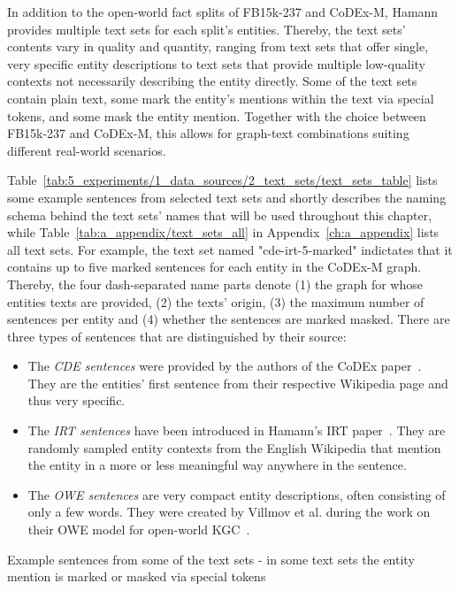In addition to the open-world fact splits of FB15k-237 and CoDEx-M, Hamann provides multiple text sets for each split's entities. Thereby, the text sets' contents vary in quality and quantity, ranging from text sets that offer single, very specific entity descriptions to text sets that provide multiple low-quality contexts not necessarily describing the entity directly. Some of the text sets contain plain text, some mark the entity's mentions within the text via special tokens, and some mask the entity mention. Together with the choice between FB15k-237 and CoDEx-M, this allows for graph-text combinations suiting different real-world scenarios.

Table~\ref{tab:5_experiments/1_data_sources/2_text_sets/text_sets_table} lists some example sentences from selected text sets and shortly describes the naming schema behind the text sets' names that will be used throughout this chapter, while Table~\ref{tab:a_appendix/text_sets_all} in Appendix~\ref{ch:a_appendix} lists all text sets. For example, the text set named "cde-irt-5-marked" indictates that it contains up to five marked sentences for each entity in the CoDEx-M graph. Thereby, the four dash-separated name parts denote (1) the graph for whose entities texts are provided, (2) the texts' origin, (3) the maximum number of sentences per entity and (4) whether the sentences are marked masked. There are three types of sentences that are distinguished by their source:

\begin{itemize}
    \item The \emph{CDE sentences} were provided by the authors of the CoDEx paper~\cite{}. They are the entities' first sentence from their respective Wikipedia page and thus very specific.
    \item The \emph{IRT sentences} have been introduced in Hamann's IRT paper~\cite{}. They are randomly sampled entity contexts from the English Wikipedia that mention the entity in a more or less meaningful way anywhere in the sentence.
    \item The \emph{OWE sentences} are very compact entity descriptions, often consisting of only a few words. They were created by Villmov et al. during the work on their OWE model for open-world KGC~\cite{Shah2019AnOE}.
\end{itemize}

\begin{table}
    \centering
    
    \caption{Example sentences from some of the text sets - in some text sets the entity mention is marked or masked via special tokens}
    \label{tab:5_experiments/1_data_sources/2_text_sets/text_sets_table}
\end{table}
